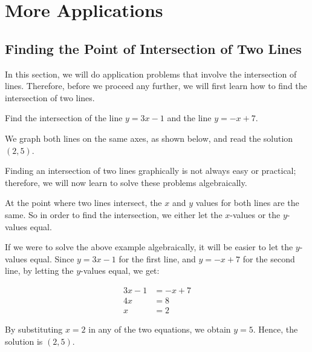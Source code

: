 
\section{More Applications}
\subsection{Finding the Point of Intersection of Two Lines}

In this section, we will do application problems that involve the intersection of lines. Therefore, before we proceed any further, we will first learn how to find the intersection of two lines.

\begin{example}
Find the intersection of the line $y = 3x - 1$ and the line $y = -x + 7$.
\end{example}

\begin{solution}
We graph both lines on the same axes, as shown below, and read the solution $(2, 5)$.
\begin{center}
\end{center}

Finding an intersection of two lines graphically is not always easy or practical; therefore, we will now learn to solve these problems algebraically.

At the point where two lines intersect, the $x$ and $y$ values for both lines are the same. So in order to find the intersection, we either let the $x$-values or the $y$-values equal.

If we were to solve the above example algebraically, it will be easier to let the $y$-values equal. Since $y = 3x - 1$ for the first line, and $y = -x + 7$ for the second line, by letting the $y$-values equal, we get:

\begin{align*}
3x - 1 &= -x + 7 \\
4x &= 8 \\
x &= 2
\end{align*}

By substituting $x = 2$ in any of the two equations, we obtain $y = 5$. Hence, the solution is $(2, 5)$.
\end{solution}



